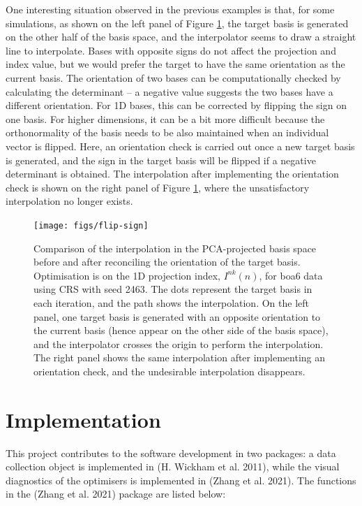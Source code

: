 One interesting situation observed in the previous examples is that, for some simulations, as shown on the left panel of Figure \ref{fig:flip-sign}, the target basis is generated on the other half of the basis space, and the interpolator seems to draw a straight line to interpolate. Bases with opposite signs do not affect the projection and index value, but we would prefer the target to have the same orientation as the current basis. The orientation of two bases can be computationally checked by calculating the determinant -- a negative value suggests the two bases have a different orientation. For 1D bases, this can be corrected by flipping the sign on one basis. For higher dimensions, it can be a bit more difficult because the orthonormality of the basis needs to be also maintained when an individual vector is flipped. Here, an orientation check is carried out once a new target basis is generated, and the sign in the target basis will be flipped if a negative determinant is obtained. The interpolation after implementing the orientation check is shown on the right panel of Figure \ref{fig:flip-sign}, where the unsatisfactory interpolation no longer exists.

\begin{figure}

{\centering \texttt{[image: figs/flip-sign]} 

}

\caption{Comparison of the interpolation in the PCA-projected basis space before and after reconciling the orientation of the target basis. Optimisation is on the 1D projection index, $I^{nk}(n)$, for boa6 data using CRS with seed 2463. The dots represent the target basis in each iteration, and the path shows the interpolation. On the left panel, one target basis is generated with an opposite orientation to the current basis (hence appear on the other side of the basis space), and the interpolator crosses the origin to perform the interpolation. The right panel shows the same interpolation after implementing an orientation check, and the undesirable interpolation disappears.}\label{fig:flip-sign}
\end{figure}

\hypertarget{implementation}{%
\section{Implementation}\label{implementation}}

This project contributes to the software development in two packages: a data collection object is implemented in  (H. Wickham et al. 2011), while the visual diagnostics of the optimisers is implemented in  (Zhang et al. 2021). The functions in the  (Zhang et al. 2021) package are listed below:

